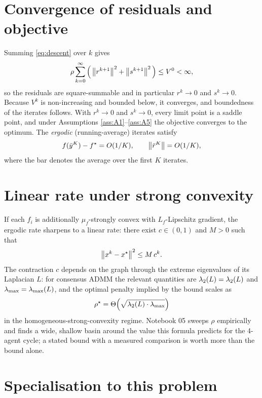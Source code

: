 \documentclass[11pt]{article}
\begin{document}
\section{Convergence of residuals and objective}

Summing \eqref{eq:descent} over $k$ gives
\begin{equation}
\rho\sum_{k=0}^{\infty}\Big(\left\lVert r^{k+1} \right\rVert^2 + \left\lVert s^{k+1} \right\rVert^2\Big) \le V^0 < \infty,
\end{equation}
so the residuals are square-summable and in particular $r^k \to 0$ and $s^k \to 0$. Because
$V^k$ is non-increasing and bounded below, it converges, and boundedness of the iterates
follows. With $r^k \to 0$ and $s^k \to 0$, every limit point is a saddle point, and under
Assumptions \ref{ass:A1}--\ref{ass:A5} the objective converges to the optimum. The
\emph{ergodic} (running-average) iterates satisfy
\begin{equation}
f(\bar y^K) - f^\star = O(1/K),
\qquad
\left\lVert \bar r^K \right\rVert = O(1/K),
\end{equation}
where the bar denotes the average over the first $K$ iterates.

\section{Linear rate under strong convexity}

If each $f_i$ is additionally $\mu_f$-strongly convex with $L_f$-Lipschitz gradient, the
ergodic rate sharpens to a linear rate: there exist $c \in (0,1)$ and $M > 0$ such that
\begin{equation}
\left\lVert x^k - x^\star \right\rVert^2 \le M\, c^{k}.
\end{equation}
The contraction $c$ depends on the graph through the extreme eigenvalues of its Laplacian
$L$: for consensus ADMM the relevant quantities are $\lambda_2(L) = \lambda_2(L)$ and
$\lambda_{\max} = \lambda_{\max}(L)$, and the optimal penalty implied by the bound scales as
\begin{equation}
\rho^\star = \Theta\Big(\sqrt{\lambda_2(L) \cdot \lambda_{\max}}\Big)
\end{equation}
in the homogeneous-strong-convexity regime. Notebook 05 sweeps $\rho$ empirically and
finds a wide, shallow basin around the value this formula predicts for the 4-agent cycle;
a stated bound with a measured comparison is worth more than the bound alone.

\section{Specialisation to this problem}
\end{document}
